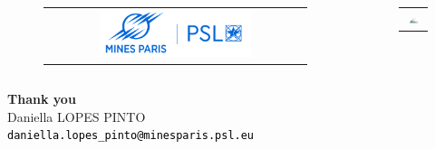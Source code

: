 \documentclass[9pt]{beamer}
\begin{document}
\begin{frame}{}

    \begin{columns}

        \begin{column}{0.6\textwidth}
            \begin{figure}
                \begin{tabular}{c}
                    \includegraphics[width=0.6\textwidth]{TEMPLATE_IMAGES/MINES.png} \\
                \end{tabular}
            \end{figure}
        \end{column}

        \begin{column}{0.4\textwidth}
            \begin{figure}
                \begin{tabular}{c}
                    \includegraphics[width=0.5\textwidth]{TEMPLATE_IMAGES/MESSIAH.pdf} \\
                \end{tabular}
            \end{figure}
        \end{column}

    \end{columns}

    \vspace{0.5cm}

    \noindent\makebox[\linewidth]{\rule{1.0\textwidth}{0.4pt}}

    \vspace{0.3cm}

    \begin{center}
        \Huge{\textcolor{MINESBlue}{\textbf{Thank you}}} \\
        \vspace{1.0cm}
        \normalsize Daniella LOPES PINTO \\
        \vspace{0.1cm}
        \small \texttt{\textcolor{black}{daniella.lopes\_pinto@minesparis.psl.eu}}
    \end{center}


\end{frame}
\end{document}
